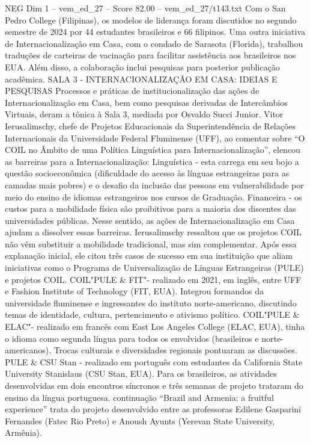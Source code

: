 \begin{textsample}{NEG Dim 1 – vem\_ed\_27 – Score 82.00 – vem\_ed\_27/t143.txt}
Com o San Pedro College (Filipinas), os modelos de liderança foram discutidos no segundo semestre de 2024 por 44 estudantes brasileiros e 66 filipinos.
Uma outra iniciativa de Internacionalização em Casa, com o condado de Sarasota (Florida), trabalhou traduções de carteiras de vacinação para facilitar assistência aos brasileiros nos EUA.
Além disso, a colaboração inclui pesquisas para posterior publicação acadêmica.
SALA 3 - INTERNACIONALIZAÇÃO EM CASA: IDEIAS E PESQUISAS Processos e práticas de institucionalização das ações de Internacionalização em Casa, bem como pesquisas derivadas de Intercâmbios Virtuais, deram a tônica à Sala 3, mediada por Osvaldo Succi Junior.
Vitor Ierusalimschy, chefe de Projetos Educacionais da Superintendência de Relações Internacionais da Universidade Federal Fluminense (UFF), ao comentar sobre “O COIL no Âmbito de uma Política Linguística para Internacionalização”, elencou as barreiras para a Internacionalização: Linguística - esta carrega em seu bojo a questão socioeconômica (dificuldade do acesso às línguas estrangeiras para as camadas mais pobres) e o desafio da inclusão das pessoas em vulnerabilidade por meio do ensino de idiomas estrangeiros nos cursos de Graduação.
Financeira - os custos para a mobilidade física são proibitivos para a maioria dos discentes das universidades públicas.
Nesse sentido, as ações de Internacionalização em Casa ajudam a dissolver essas barreiras.
Ierusalimschy ressaltou que os projetos COIL não vêm substituir a mobilidade tradicional, mas sim complementar.
Após essa explanação inicial, ele citou três casos de sucesso em sua instituição que aliam iniciativas como o Programa de Universalização de Línguas Estrangeiras (PULE) e projetos COIL.
COIL"PULE \& FIT"- realizado em 2021, em inglês, entre UFF e Fashion Institute of Technology (FIT, EUA).
Integrou formandos da universidade fluminense e ingressantes do instituto norte-americano, discutindo temas de identidade, cultura, pertencimento e ativismo político.
COIL"PULE \& ELAC"- realizado em francês com East Los Angeles College (ELAC, EUA), tinha o idioma como segunda língua para todos os envolvidos (brasileiros e norte-americanos).
Trocas culturais e diversidades regionais pontuaram as discussões.
PULE \& CSU Stan - realizado em português com estudantes da California State University Stanislaus (CSU Stan, EUA).
Para os brasileiros, as atividades desenvolvidas em dois encontros síncronos e três semanas de projeto trataram do ensino da língua portuguesa. continuação “Brazil and Armenia: a fruitful experience” trata do projeto desenvolvido entre as professoras Edilene Gasparini Fernandes (Fatec Rio Preto) e Anoush Ayunts (Yerevan State University, Armênia).

\end{textsample}
